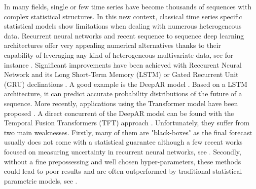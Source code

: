 \documentclass[letterpaper]{article} %
\begin{document}

In many fields, single or few time series have become thousands of sequences with complex statistical structures. In this new context, classical time series specific statistical models show limitations when dealing with numerous heterogeneous data. Recurrent neural networks and recent sequence to sequence deep learning architectures offer very appealing numerical alternatives thanks to their capability of leveraging any kind of heterogeneous multivariate data, see for instance \citep{ hochreiter1997long,vaswani2017attention, salinas2020deepar, li2019enhancing, lim2019temporal}. %
Significant improvements have been achieved with Reccurent Neural Network and its Long Short-Term Memory (LSTM) or Gated Recurrent Unit (GRU)  declinations \citep{8614252}. 
A good example is the DeepAR model \citep{salinas2020deepar}. Based on a LSTM architecture, it can predict accurate probability distributions of the future of a sequence. More recently, applications using the Transformer model have been proposed  \citep{li2019enhancing}. A direct concurrent of the DeepAR model can be found with the Temporal Fusion Transformers (TFT) approach \citep{lim2019temporal}.  Unfortunately, they suffer from two main weaknesses. Firstly, many of them are "black-boxes"  as the final forecast usually does not come with a statistical guarantee  although a few recent works focused on measuring uncertainty in recurrent neural networks, see  \cite{martin2020monte}. Secondly, without a fine prepossessing and well chosen hyper-parameters, these methods could lead to poor results and are often outperformed by traditional statistical parametric models, see \cite{makridakis2018m4}.
\end{document}
